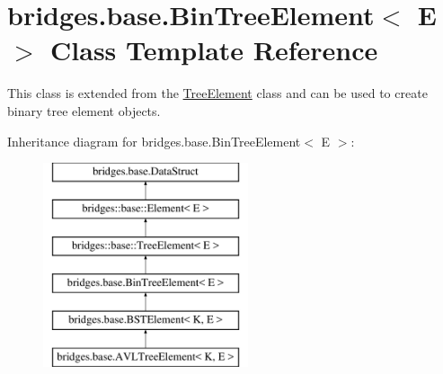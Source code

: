 \hypertarget{classbridges_1_1base_1_1_bin_tree_element}{}\section{bridges.\+base.\+Bin\+Tree\+Element$<$ E $>$ Class Template Reference}
\label{classbridges_1_1base_1_1_bin_tree_element}


This class is extended from the \hyperlink{classbridges_1_1base_1_1_tree_element}{Tree\+Element} class and can be used to create binary tree element objects.  


Inheritance diagram for bridges.\+base.\+Bin\+Tree\+Element$<$ E $>$\+:\begin{figure}[H]
\begin{center}
\leavevmode
\includegraphics[height=6.000000cm]{classbridges_1_1base_1_1_bin_tree_element}
\end{center}
\end{figure}
